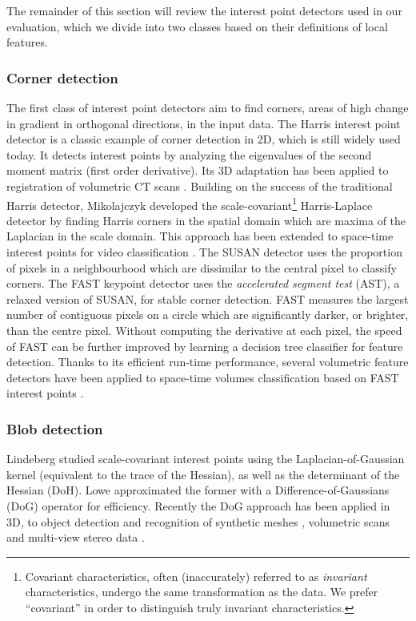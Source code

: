 The remainder of this section will review the interest point detectors used in our evaluation, which we divide into two classes based on their definitions of local features.

\subsubsection{Corner detection}
The first class of interest point detectors aim to find corners, \ie areas of high change in gradient in orthogonal directions, in the input data. 
The Harris interest point detector \cite{Harris1988} is a classic example of corner detection in 2D, which is still widely used today. It detects interest points by analyzing the eigenvalues of the second moment matrix (first order derivative). Its 3D adaptation has been applied to registration of volumetric CT scans \cite{Ruiz-Alzola2001,dalvi2010}.  
Building on the success of the traditional Harris detector, Mikolajczyk \cite{Mikolajczyk2004} developed the scale-covariant\footnote{Covariant characteristics, often (inaccurately) referred to as \emph{invariant} characteristics, undergo the same transformation as the data. We prefer ``covariant'' in order to distinguish truly invariant characteristics.} Harris-Laplace detector by finding Harris corners in the spatial domain which are maxima of the Laplacian in the scale domain. This approach has been extended to space-time interest points for video classification \cite{Laptev2005}. The SUSAN detector \cite{Smith1997} uses the proportion of pixels in a neighbourhood which are dissimilar to the central pixel to classify corners. The FAST keypoint detector \cite{Rosten2010} uses the \emph{accelerated segment test} (AST), a relaxed version of SUSAN, for stable corner detection. FAST measures the largest number of contiguous pixels on a circle which are significantly darker, or brighter, than the centre pixel. Without computing the derivative at each pixel, the speed of FAST can be further improved by learning a decision tree classifier for feature detection. Thanks to its efficient run-time performance, several volumetric feature detectors have been applied to space-time volumes classification based on FAST interest points \cite{Koelstra2009,Yu2010}. 

\subsubsection{Blob detection}

Lindeberg \cite{Lindeberg1998} studied scale-covariant interest points using the Laplacian-of-Gaussian kernel (equivalent to the trace of the Hessian), as well as the determinant of the Hessian (DoH).
Lowe \cite{Lowe2004} approximated the former with a Difference-of-Gaussians (DoG) operator for efficiency. Recently the DoG approach has been applied in 3D, to object detection and recognition of synthetic meshes \cite{Wessel2006}, volumetric scans \cite{Flitton2010} and multi-view stereo data \cite{Pham2011}.

